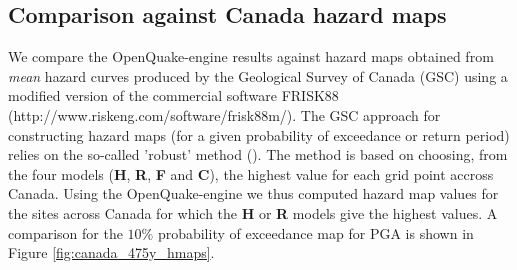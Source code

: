 \subsection{Comparison against Canada hazard maps}
We compare the OpenQuake-engine results against hazard maps obtained from \textit{mean} hazard curves produced by the Geological Survey of Canada (GSC) using a modified version of the commercial software FRISK88 (http://www.riskeng.com/software/frisk88m/). The GSC approach for constructing hazard maps (for a given probability of exceedance or return period) relies on the so-called 'robust' method (\cite{adams2003}). The method is based on choosing, from the four models (\textbf{H}, \textbf{R}, \textbf{F} and \textbf{C}), the highest value for each grid point accross Canada. Using the OpenQuake-engine we thus computed hazard map values for the sites across Canada for which the \textbf{H} or \textbf{R} models give the highest values. A comparison for the $10\%$ probability of exceedance map for PGA is shown in Figure \ref{fig:canada_475y_hmaps}.
